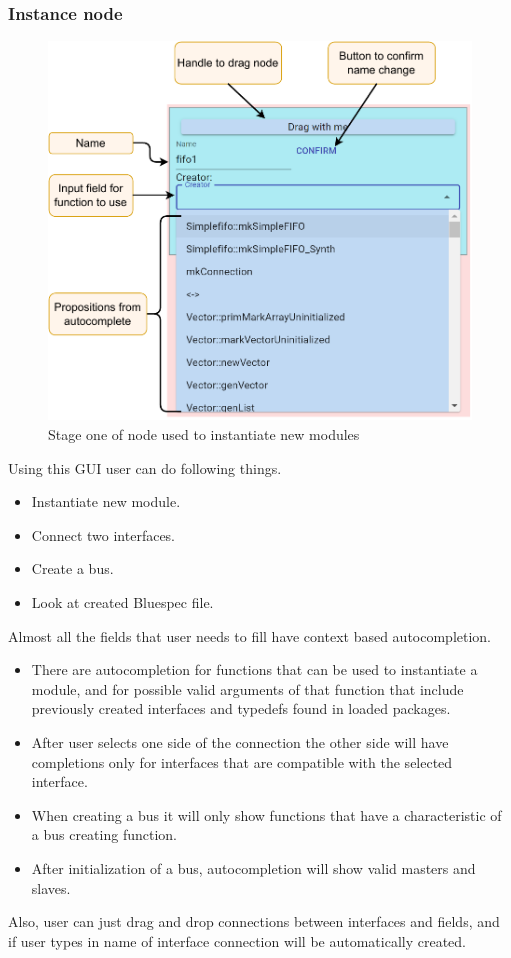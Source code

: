 \documentclass[12pt]{report}
\begin{document}
\subsubsection{Instance node}
\begin{figure}[h!]
    \centering
    
    \includegraphics[width=0.75\columnwidth]{pdfExports/LargeMapInstanceNode.pdf}
    \caption{Stage one of node used to instantiate new modules}
\end{figure}
Using this GUI user can do following things. 
\begin{itemize}
    \item Instantiate new module. 
    \item Connect two interfaces.
    \item Create a bus.
    \item Look at created Bluespec file.
\end{itemize}
Almost all the fields that user needs to fill have context based autocompletion. 
\begin{itemize}
    \item There are autocompletion for functions that can be used to instantiate a module, and for possible valid arguments of that function that include previously created interfaces and typedefs found in loaded packages.
    \item After user selects one side of the connection the other side will have completions only for interfaces that are compatible with the selected interface. 
    \item When creating a bus it will only show functions that have a characteristic of a bus creating function.
    \item After initialization of a bus, autocompletion will show valid masters and slaves. 
\end{itemize}
Also, user can just drag and drop connections between interfaces and fields, and if user types in name of interface connection will be automatically created.
\end{document}
